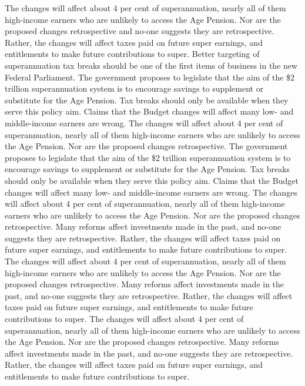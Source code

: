 \documentclass{article}
\begin{document}
The changes will affect about 4 per cent of superannuation, nearly all of them high-income earners who are unlikely to access the Age Pension. 
Nor are the proposed changes retrospective and no-one suggests they are retrospective.
Rather, the changes will affect taxes paid on future super earnings, and entitlements to make future contributions to super. 
Better targeting of superannuation tax breaks should be one of the first items of business in the new Federal Parliament.
The government proposes to legislate that the aim of the \$2 trillion superannuation system is to encourage savings to supplement or substitute for the Age Pension.
Tax breaks should only be available when they serve this policy aim.
Claims that the Budget changes will affect many low- and middle-income earners are wrong.
The changes will affect about 4 per cent of superannuation, nearly all of them high-income earners who are unlikely to access the Age Pension. 
Nor are the proposed changes retrospective.
The government proposes to legislate that the aim of the \$2 trillion superannuation system is to encourage savings to supplement or substitute for the Age Pension.
Tax breaks should only be available when they serve this policy aim.
Claims that the Budget changes will affect many low- and middle-income earners are wrong.
The changes will affect about 4 per cent of superannuation, nearly all of them high-income earners who are unlikely to access the Age Pension. 
Nor are the proposed changes retrospective.
Many reforms affect investments made in the past, and no-one suggests they are retrospective.
Rather, the changes will affect taxes paid on future super earnings, and entitlements to make future contributions to super. 
The changes will affect about 4 per cent of superannuation, nearly all of them high-income earners who are unlikely to access the Age Pension. 
Nor are the proposed changes retrospective.
Many reforms affect investments made in the past, and no-one suggests they are retrospective.
Rather, the changes will affect taxes paid on future super earnings, and entitlements to make future contributions to super. 
The changes will affect about 4 per cent of superannuation, nearly all of them high-income earners who are unlikely to access the Age Pension. 
Nor are the proposed changes retrospective.
Many reforms affect investments made in the past, and no-one suggests they are retrospective.
Rather, the changes will affect taxes paid on future super earnings, and entitlements to make future contributions to super. 
\end{document}
